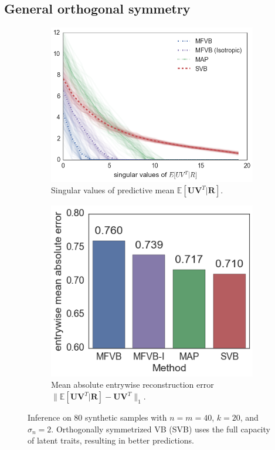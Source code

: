 \documentclass{article}
\newcommand{\E}{\mathbb{E}}
\renewcommand{\v}[1]{\mathbf{#1}}
\begin{document}

\subsection{General orthogonal symmetry}
\begin{figure}[t]
\centering
\begin{subfigure}[t]{.5\textwidth}
\includegraphics[width=\textwidth]{rot_sv_plot}
\caption{Singular values of predictive mean $\E[\v{U}\v{V}^T |
  \v{R}]$. }
\label{fig:rot_svs}
\end{subfigure}
\begin{subfigure}[t]{.45\textwidth}
\includegraphics[width=\textwidth]{rot_error_barplot}
\caption{Mean absolute entrywise reconstruction error $\|\E[\v{U}\v{V}^T | \v{R}] - \v{U}\v{V}^T
  \|_1$.}
\label{fig:rot_error}
\end{subfigure}
\caption{Inference on 80 synthetic samples with $n=m=40$, $k=20$, and $\sigma_n
  = 2$. Orthogonally symmetrized VB (SVB) uses the full capacity of
  latent traits, resulting in better predictions.}
\end{figure}
\end{document}
